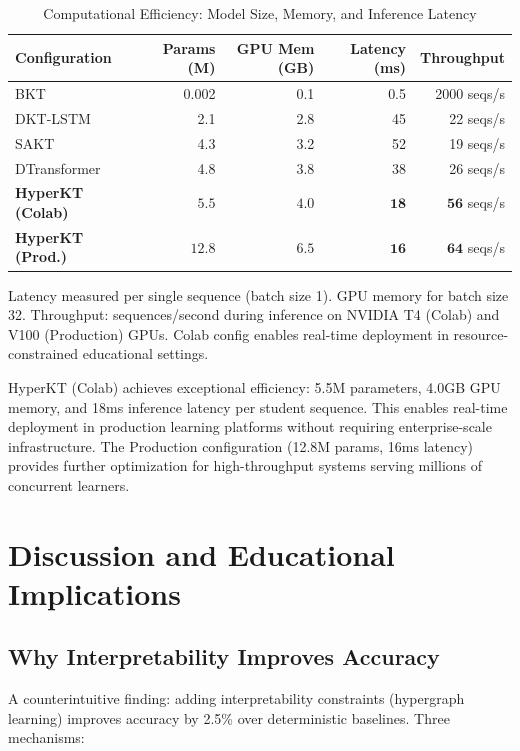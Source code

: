 \documentclass[preprint,12pt]{elsarticle}
\begin{document}
\begin{table}[H]\centering
\caption{Computational Efficiency: Model Size, Memory, and Inference Latency}\label{tab:efficiency}
\small
\begin{tabularx}{\linewidth}{@{\extracolsep{\fill}}lrrrr@{}}\toprule
\textbf{Configuration} & \textbf{Params (M)} & \textbf{GPU Mem (GB)} & \textbf{Latency (ms)} & \textbf{Throughput}\\\midrule
BKT & 0.002 & 0.1 & 0.5 & 2000 seqs/s\\
DKT-LSTM & 2.1 & 2.8 & 45 & 22 seqs/s\\
SAKT & 4.3 & 3.2 & 52 & 19 seqs/s\\
DTransformer & 4.8 & 3.8 & 38 & 26 seqs/s\\\midrule
\textbf{HyperKT (Colab)} & $\mathbf{5.5}$ & $\mathbf{4.0}$ & $\mathbf{18}$ & $\mathbf{56}$ seqs/s\\
\textbf{HyperKT (Prod.)} & $\mathbf{12.8}$ & $\mathbf{6.5}$ & $\mathbf{16}$ & $\mathbf{64}$ seqs/s\\
\bottomrule\end{tabularx}
\begin{flushleft}\footnotesize
Latency measured per single sequence (batch size 1). GPU memory for batch size 32. Throughput: sequences/second during inference on NVIDIA T4 (Colab) and V100 (Production) GPUs. Colab config enables real-time deployment in resource-constrained educational settings.
\end{flushleft}
\end{table}

HyperKT (Colab) achieves exceptional efficiency: 5.5M parameters, 4.0GB GPU memory, and 18ms inference latency per student sequence. This enables real-time deployment in production learning platforms without requiring enterprise-scale infrastructure. The Production configuration (12.8M params, 16ms latency) provides further optimization for high-throughput systems serving millions of concurrent learners.

\section{Discussion and Educational Implications}\label{sec:discussion}

\subsection{Why Interpretability Improves Accuracy}

A counterintuitive finding: adding interpretability constraints (hypergraph learning) improves accuracy by 2.5\% over deterministic baselines. Three mechanisms:
\end{document}
